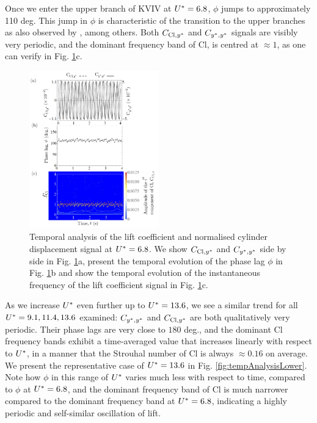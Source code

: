 \documentclass[oneside]{utmthesis}
\begin{document}
Once we enter the upper branch of KVIV at  $U^{*} = 6.8$, $\phi$ jumps to approximately 110 deg. This jump in $\phi$ is characteristic of the transition to the upper branches as also observed by \citet{Maruai2018}, among others. Both $C_{\text{Cl},y^{*}}$ and $C_{y^{*},y^{*}}$ signals are visibly very periodic, and the dominant frequency band of Cl, is centred at $\approx 1$, as one can verify in Fig. \ref{fig:tempAnalysisUpper}c.

\begin{figure}
  \centering
  \includegraphics[width=0.5\textwidth]{figs/tempAnalysisUpper}
  \caption{Temporal analysis of the lift coefficient and normalised cylinder displacement signal at $U^{*} = 6.8$. We show $C_{\text{Cl},y^{*}}$ and $C_{y^{*},y^{*}}$ side by side in Fig. \ref{fig:tempAnalysisUpper}a, present the temporal evolution of the phase lag $\phi$ in Fig. \ref{fig:tempAnalysisUpper}b and show the temporal evolution of the instantaneous frequency of the lift coefficient signal in Fig. \ref{fig:tempAnalysisUpper}c.} \label{fig:tempAnalysisUpper}
\end{figure}

As we increase $U^{*}$ even further up to $U^{*} = 13.6$, we see a similar trend for all $U^{*} = 9.1, 11.4, 13.6$ examined: $C_{y^{*},y^{*}}$ and $C_{\text{Cl},y^{*}}$ are both qualitatively very periodic. Their phase lags are very close to $180$ deg., and the dominant Cl frequency bands exhibit a time-averaged value that increases linearly with respect to $U^{*}$, in a manner that the Strouhal number of Cl is always $\approx 0.16$ on average. We present the representative case of $U^{*} = 13.6$ in Fig. \ref{fig:tempAnalysisLower}. Note how $\phi$ in this range of $U^{*}$ varies much less with respect to time, compared to $\phi$ at $U^{*} = 6.8$, and the dominant frequency band of Cl is much narrower compared to the dominant frequency band at $U^{*} = 6.8$, indicating a highly periodic and self-similar oscillation of lift.
\end{document}
